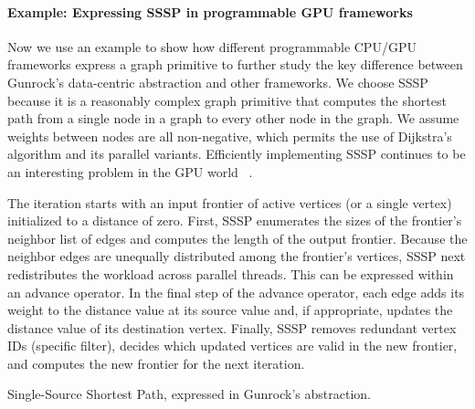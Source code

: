 \documentclass[format=acmsmall,review=false,screen=true]{acmart}
\begin{document}
\paragraph{Example: Expressing SSSP in programmable GPU frameworks}
Now we use an example to show how different programmable CPU/GPU
frameworks express a graph primitive to further study the key
difference between Gunrock's data-centric abstraction and other
frameworks. We choose SSSP because it is a reasonably complex graph
primitive that computes the shortest path from a single node in a
graph to every other node in the graph. We assume weights between
nodes are all non-negative, which permits the use of Dijkstra's
algorithm and its parallel variants. Efficiently implementing SSSP
continues to be an interesting problem in the GPU world
~\cite{Burtscher:2012:AQS,Davidson:2014:WPG,Delling:2010:PHS}.

The iteration starts with an input frontier of active vertices (or a
single vertex) initialized to a distance of zero. First, SSSP
enumerates the sizes of the frontier's neighbor list of edges and
computes the length of the output frontier. Because the neighbor edges
are unequally distributed among the frontier's vertices, SSSP next
redistributes the workload across parallel threads. This can be
expressed within an advance operator. In the final step of the advance
operator, each edge adds its weight to the distance value at its
source value and, if appropriate, updates the distance value of its
destination vertex. Finally, SSSP removes redundant vertex IDs
(specific filter), decides which updated vertices are valid in the new
frontier, and computes the new frontier for the next iteration.

  \begin{algorithm}
\caption{Single-Source Shortest Path, expressed in Gunrock's
  abstraction.\label{alg:ssspcode}}
\end{algorithm}
\end{document}
